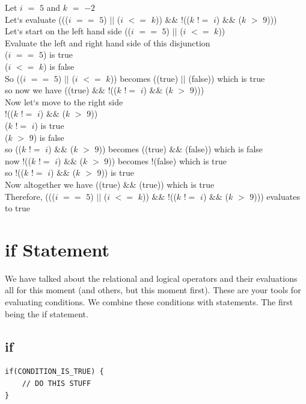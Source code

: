 \documentclass[11]{article}
\begin{document}
Let $i$ $=$ $5$ and $k$ $=$ $-2$\\
Let`s evaluate ((($i$ $==$ $5$) $||$ ($i$ $<=$ $k$)) $\&\&$ $!$(($k$ $!=$ $i$) $\&\&$ ($k$ $>$ $9$)))\\

Let`s start on the left hand side (($i$ $==$ $5$) $||$ ($i$ $<=$ $k$))\\
Evaluate the left and right hand side of this disjunction\\

($i$ $==$ $5$) is true\\
($i$ $<=$ $k$) is false\\
So (($i$ $==$ $5$) $||$ ($i$ $<=$ $k$)) becomes ((true) $||$ (false)) which is true\\

so now we have ((true) $\&\&$ $!$(($k$ $!=$ $i$) $\&\&$ ($k$ $>$ $9$)))\\

Now let`s move to the right side\\
$!$(($k$ $!=$ $i$) $\&\&$ ($k$ $>$ $9$)) \\
($k$ $!=$ $i$) is true\\
($k$ $>$ $9$) is false\\
so (($k$ $!=$ $i$) $\&\&$ ($k$ $>$ $9$)) becomes ((true) $\&\&$ (false)) which is false\\
now $!$(($k$ $!=$ $i$) $\&\&$ ($k$ $>$ $9$)) becomes $!$(false) which is true\\
so $!$(($k$ $!=$ $i$) $\&\&$ ($k$ $>$ $9$)) is true\\

Now altogether we have ((true) $\&\&$ (true)) which is true\\
Therefore, ((($i$ $==$ $5$) $||$ ($i$ $<=$ $k$)) $\&\&$ $!$(($k$ $!=$ $i$) $\&\&$ ($k$ $>$ $9$))) evaluates to true\\



\section{if Statement}
We have talked about the relational and logical operators and their evaluations all for this moment (and others, but this moment first). These are your tools for evaluating conditions. We combine these conditions with statements. The first being the if statement.\\
\subsection{if}
\begin{lstlisting}
if(CONDITION_IS_TRUE) {
    // DO THIS STUFF
}
\end{lstlisting}
\end{document}
